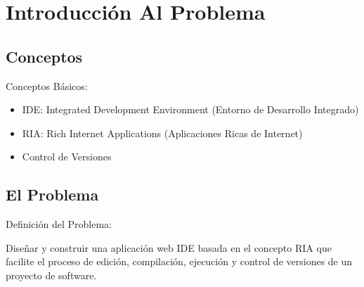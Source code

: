 \section{Introducción Al Problema}


\subsection{Conceptos}

\begin{frame}{Conceptos Básicos:\newline}

\begin{itemize}
	
	\pause \item IDE: Integrated Development Environment (Entorno de Desarrollo Integrado)
	
	\pause \item RIA: Rich Internet Applications (Aplicaciones Ricas de Internet)
	
	\pause \item Control de Versiones
	
\end{itemize}

\end{frame}


\subsection{El Problema}

\begin{frame}{Definición del Problema:\newline}

Diseñar y construir una aplicación web IDE basada en el concepto RIA que facilite el proceso de edición, compilación, ejecución y control de versiones de un proyecto de software.

\end{frame}
